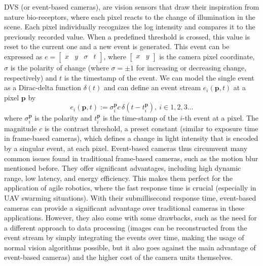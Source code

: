 \ac{DVS} (or event-based cameras), are vision sensors that draw their inspiration from nature bio-receptors, where each pixel reacts
to the change of illumination in the scene. Each pixel individually recognizes the log intensity and compares it to the previously
recorded value. When a predefined threshold is crossed, this value is reset to the current one and a new event is generated. This event can be expressed as $e = \begin{bmatrix} x & y & \sigma & t \end{bmatrix}$, where $\begin{bmatrix} x & y \end{bmatrix}$
is the camera pixel coordinate, $\sigma$ is the polarity of change (where $\sigma = \pm 1$ for increasing or decreasing change, respectively) and $t$ is the timestamp of the event. \cite{gallego22event} \cite{scheerlinck2018event} We can model the single event as a Dirac-delta function $\delta(t)$ and can define an event stream
$e_i(\boldsymbol{p}, t)$ at a pixel $\boldsymbol{p}$ by  \cite{scheerlinck2018event}
\begin{equation}
e_i(\boldsymbol{p}, t) := \sigma_i^{\boldsymbol{p}} c \, \delta(t - t_i^{\boldsymbol{p}}), \ i \in 1, 2, 3 ...
\label{eq:event_eq}
\end{equation}
where $\sigma_i^{\boldsymbol{p}}$ is the polarity and $t_i^{\boldsymbol{p}}$ is the time-stamp of the $i$-th event at a pixel.
The magnitude $c$ is the contrast threshold, a preset constant (similar to exposure time in frame-based cameras), which defines a change in light intensity that is encoded by a singular event, at each pixel. Event-based cameras thus circumvent many common issues found in traditional frame-based cameras, such as the motion blur mentioned before. They offer significant advantages, including high dynamic range, low latency,
and energy efficiency.
This makes them perfect for the application of agile robotics,
where the fast response time is crucial (especially in UAV swarming situations). With their submillisecond response time,
event-based cameras can provide a significant advantage over traditional cameras in these applications.
However, they also come with some drawbacks, such as the need for a different approach to
data processing (images can be reconstructed from the event stream by simply integrating the events over time,
making the usage of normal vision algorithms possible, but it also goes against the main advantage of event-based cameras)
and the higher cost of the camera units themselves. \cite{gallego22event}

